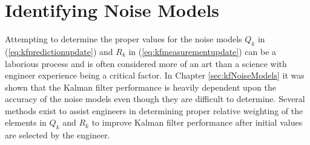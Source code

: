 \section{Identifying Noise Models}
\label{sec:kfIdentifyNoiseModels}
Attempting to determine the proper values for the noise models $Q_k$ in (\ref{eq:kfpredictionupdate}) and $R_k$ in (\ref{eq:kfmeasurementupdate}) can be a laborious process and is often considered more of an art than a science with engineer experience being a critical factor. In Chapter \ref{sec:kfNoiseModels} it was shown that the Kalman filter performance is heavily dependent upon the accuracy of the noise models even though they are difficult to determine. Several methods exist to assist engineers in determining proper relative weighting of the elements in $Q_k$ and $R_k$ to improve Kalman filter performance after initial values are selected by the engineer.

